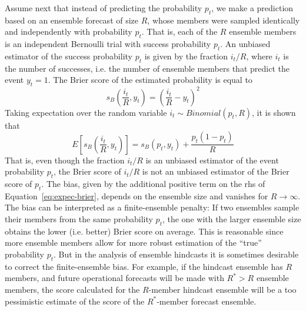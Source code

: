 \documentclass[article]{jss}
\begin{document}
Assume next that instead of predicting the probability $p_t$, we make a prediction based on an ensemble forecast of size $R$, whose members were sampled identically and independently with probability $p_t$.
That is, each of the $R$ ensemble members is an independent Bernoulli trial with success probability $p_t$.
An unbiased estimator of the success probability $p_t$ is given by the fraction $i_t/R$, where $i_t$ is the number of successes, i.e. the number of ensemble members that predict the event $y_t=1$.
The Brier score of the estimated probability is equal to
%
\begin{equation}
s_{B}\left(\frac{i_t}{R}, y_t\right) = \left(\frac{i_t}{R} - y_t\right)^2
\label{eq:unfair-brier}
\end{equation}
%
Taking expectation over the random variable $i_t \sim Binomial(p_t, R)$, it is shown that \citep{ferro2008effect}
%
\begin{equation}
E\left[s_{B}\left(\frac{i_t}{R}, y_t\right)\right] = s_{B}(p_t, y_t) +\frac{p_t(1-p_t)}{R}
\label{eq:expec-brier}
\end{equation}
%
That is, even though the fraction $i_t/R$ is an unbiased estimator of the event probability $p_t$, the Brier score of $i_t/R$ is not an unbiased estimator of the Brier score of $p_t$.
The bias, given by the additional positive term on the rhs of Equation~\ref{eq:expec-brier}, depends on the ensemble size and vanishes for $R\rightarrow\infty$.
The bias can be interpreted as a finite-ensemble penalty: If two ensembles sample their members from the same probability $p_t$, the one with the larger ensemble size obtains the lower (i.e. better) Brier score on average.
This is reasonable since more ensemble members allow for more robust estimation of the ``true'' probability $p_t$.
But in the analysis of ensemble hindcasts it is sometimes desirable to correct the finite-ensemble bias.
For example, if the hindcast ensemble has $R$ members, and future operational forecasts will be made with $R^* > R$ ensemble members, the score calculated for the $R$-member hindcast ensemble will be a too pessimistic estimate of the score of the $R^*$-member forecast ensemble.
\end{document}
